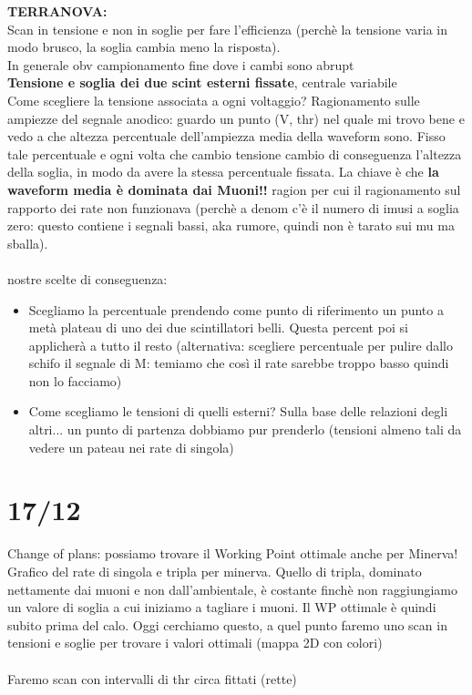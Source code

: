 \documentclass{article}
\begin{document}
\textbf{TERRANOVA:}\\
Scan in tensione e non in soglie per fare l'efficienza (perchè la tensione varia in modo brusco, la soglia cambia meno la risposta).\\
In generale obv campionamento fine dove i cambi sono abrupt\\
\textbf{Tensione e soglia dei due scint esterni fissate}, centrale variabile\\
Come scegliere la tensione associata a ogni voltaggio? Ragionamento sulle ampiezze del segnale anodico: guardo un punto (V, thr) nel quale mi trovo bene e vedo a che altezza percentuale dell'ampiezza media della waveform sono. Fisso tale percentuale e ogni volta che cambio tensione cambio di conseguenza l'altezza della soglia, in modo da avere la stessa percentuale fissata. La chiave è che 
\textbf{la waveform media è dominata dai Muoni!!} 
ragion per cui il ragionamento sul rapporto dei rate non funzionava (perchè a denom c'è il numero di imusi a soglia zero: questo contiene i segnali bassi, aka rumore, quindi non è tarato sui mu ma sballa).\\\\
nostre scelte di conseguenza:
\begin{itemize}
    \item Scegliamo la percentuale prendendo come punto di riferimento un punto a metà plateau di uno dei due scintillatori belli. Questa percent poi si applicherà a tutto il resto (alternativa: scegliere percentuale per pulire dallo schifo il segnale di M: temiamo che così il rate sarebbe troppo basso quindi non lo facciamo)
    \item Come scegliamo le tensioni di quelli esterni? Sulla base delle relazioni degli altri... un punto di partenza dobbiamo pur prenderlo (tensioni almeno tali da vedere un pateau nei rate di singola)
\end{itemize}


\section{17/12}
Change of plans: possiamo trovare il Working Point ottimale anche per Minerva! Grafico del rate di singola e tripla per minerva. Quello di tripla, dominato nettamente dai muoni e non dall'ambientale, è costante finchè non raggiungiamo un valore di soglia a cui iniziamo a tagliare i muoni. Il WP ottimale è quindi subito prima del calo. Oggi cerchiamo questo, a quel punto faremo uno scan in tensioni e soglie per trovare i valori ottimali (mappa 2D con colori)\\\\
Faremo scan con intervalli di thr circa fittati (rette)
\end{document}
